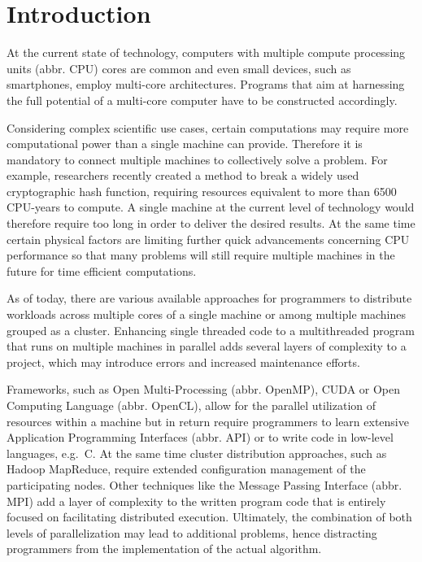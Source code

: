 \chapter{Introduction}
\label{intro}
At the current state of technology, computers with multiple compute processing units (abbr. CPU) cores are common and even small devices, such as smartphones, employ multi-core architectures\cite{arm_big_little}. Programs that aim at harnessing the full potential of a multi-core computer have to be constructed accordingly.

Considering complex scientific use cases, certain computations may require more computational power than a single machine can provide. Therefore it is mandatory to connect multiple machines to collectively solve a problem. For example, researchers recently created a method to break a widely used cryptographic hash function, requiring resources equivalent to more than 6500 CPU-years to compute\cite{shattered}. A single machine at the current level of technology would therefore require too long in order to deliver the desired results. At the same time certain physical factors are limiting further quick advancements concerning CPU performance\cite{end_of_moores_law}\cite{end_of_silicon} so that many problems will still require multiple machines in the future for time efficient computations.

As of today, there are various available approaches for programmers to distribute workloads across multiple cores of a single machine or among multiple machines grouped as a cluster. Enhancing single threaded code to a multithreaded program that runs on multiple machines in parallel adds several layers of complexity to a project, which may introduce errors and increased maintenance efforts.

Frameworks, such as Open Multi-Processing (abbr. OpenMP), CUDA or Open Computing Language (abbr. OpenCL), allow for the parallel utilization of resources within a machine but in return require programmers to learn extensive Application Programming Interfaces (abbr. API) or to write code in low-level languages, e.g.~C.
At the same time cluster distribution approaches, such as Hadoop MapReduce, require extended configuration management of the participating nodes. Other techniques like the Message Passing Interface (abbr. MPI) add a layer of complexity to the written program code that is entirely focused on facilitating distributed execution.
Ultimately, the combination of both levels of parallelization may lead to additional problems, hence distracting programmers from the implementation of the actual algorithm.


